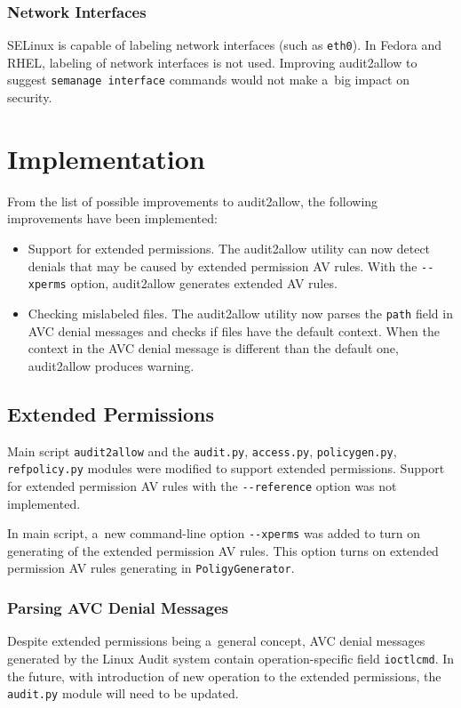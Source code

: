 \subsection{Network Interfaces}
SELinux is capable of labeling network interfaces (such as \texttt{eth0}). In
Fedora and RHEL, labeling of network interfaces is not used. Improving
audit2allow to suggest \texttt{semanage interface} commands would not make a~big
impact on security.

\chapter{Implementation}
\label{implementation}
From the list of possible improvements to audit2allow, the following
improvements have been implemented:
\begin{itemize}
    \item Support for extended permissions. The audit2allow utility can now
        detect denials that may be caused by extended permission AV rules. With
        the \texttt{-{}-xperms} option, audit2allow generates extended AV rules.
    \item Checking mislabeled files. The audit2allow utility now parses the
        \texttt{path} field in AVC denial messages and checks if files have the
        default context. When the context in the AVC denial message is different
        than the default one, audit2allow produces warning.
\end{itemize}

\section{Extended Permissions}
\label{xpermsimp}
Main script \texttt{audit2allow} and the \texttt{audit.py}, \texttt{access.py},
\texttt{policygen.py}, \texttt{refpolicy.py} modules were modified to support
extended permissions. Support for extended permission AV rules with the
\texttt{-{}-reference} option was not implemented.

In main script, a~new command-line option \texttt{-{}-xperms} was added to turn
on generating of the extended permission AV rules. This option turns on extended
permission AV rules generating in \texttt{PoligyGenerator}.

\subsection{Parsing AVC Denial Messages}
Despite extended permissions being a~general concept, AVC denial messages
generated by the Linux Audit system contain operation-specific field
\texttt{ioctlcmd}. In the future, with introduction of new operation to the
extended permissions, the \texttt{audit.py} module will need to be updated.

